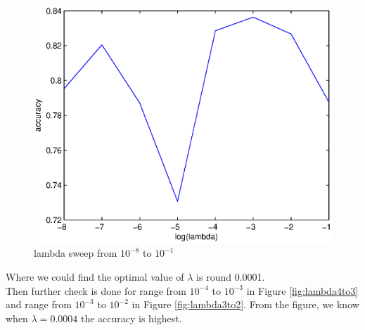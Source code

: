 \documentclass[12pt]{article}
\begin{document}
	\begin{figure}[!htb]
		\centering
		\includegraphics[scale=.7]{lambda_n8to0}
		\caption{lambda sweep from $10^{-8}$ to $10^{-1}$}
		\label{fig:lambdaLargeSweep}
	\end{figure}
	\noindent
	Where we could find the optimal value of $\lambda$ is round 0.0001.\\
	Then further check is done for range from $10^{-4}$ to $10^{-3}$ in Figure \ref{fig:lambda4to3} and range from $10^{-3}$ to $10^{-2}$ in Figure \ref{fig:lambda3to2}. From the figure, we know when $\lambda=0.0004$ the accuracy is highest.\\
	
\end{document}
